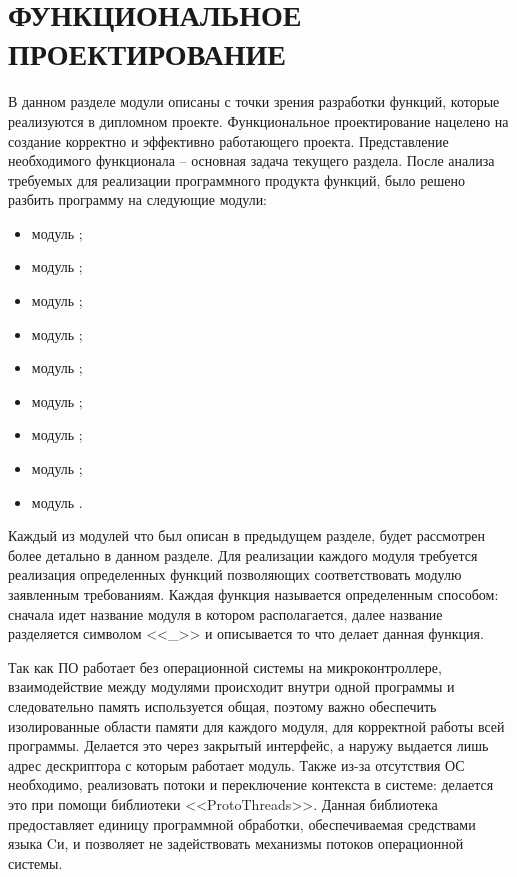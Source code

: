 \section{ФУНКЦИОНАЛЬНОЕ ПРОЕКТИРОВАНИЕ}
\label{sec:func}

В данном разделе модули описаны с точки зрения разработки функций, которые реализуются в
дипломном проекте. Функциональное проектирование нацелено на создание корректно и
эффективно работающего проекта. Представление необходимого функционала -- основная задача
текущего раздела. После анализа требуемых для реализации программного продукта
функций, было решено разбить программу на следующие модули:

\begin{itemize}
    \item модуль \modulePerifery;
    \item модуль \moduleCalib;
    \item модуль \moduleCalibControl;
    \item модуль \moduleUart;
    \item модуль \moduleMoveDetect;
    \item модуль \moduleOrientationAzimuth;
    \item модуль \moduleFindTarget;
    \item модуль \moduleFlashMemory;
    \item модуль \moduleGraphics.
\end{itemize}

Каждый из модулей что был описан в предыдущем разделе, будет рассмотрен более детально
в данном разделе. Для реализации каждого модуля требуется реализация определенных функций
позволяющих соответствовать модулю заявленным требованиям.
Каждая функция называется определенным способом: сначала идет название модуля в котором располагается,
далее название разделяется символом <<\_>> и описывается то что делает данная функция.

Так как ПО работает без операционной системы на микроконтроллере, взаимодействие между модулями происходит
внутри одной программы и следовательно память используется общая, поэтому важно обеспечить изолированные
области памяти для каждого модуля, для корректной работы всей программы. Делается это через закрытый интерфейс,
а наружу выдается лишь адрес дескриптора с которым работает модуль. Также из-за отсутствия ОС необходимо,
реализовать потоки и переключение контекста в системе: делается это при помощи библиотеки <<ProtoThreads>>.
Данная библиотека предоставляет единицу программной обработки, обеспечиваемая средствами языка Cи, и позволяет
не задействовать механизмы потоков операционной системы.

